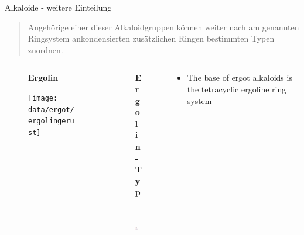   \begin{frame}[t]{Alkaloide - weitere Einteilung}
    \begin{quote}
      Angehörige einer dieser Alkaloidgruppen können weiter nach am genannten
      Ringsystem ankondensierten zusätzlichen Ringen bestimmten Typen zuordnen. \footnotemark  
    \end{quote}
  
  \begin{columns}[onlytextwidth,t]
    \begin{column}{0.3\textwidth}
      \begin{minipage}[c][0.9\textheight][l]{\linewidth}
       \begin{figure}
    \centering
    \textbf{Ergolin}\par\medskip
        \texttt{[image: data/ergot/ergolingerust]}%
\end{figure} 
      \end{minipage}
    \end{column}
    \begin{column}{0.3\textwidth}
   \begin{minipage}[c][0.9\textheight][l]{\linewidth}
       \begin{figure}
    \centering
    \textbf{Ergolin-Typ}\par\medskip
        \includegraphics[height=2cm]{data/ergot/ergolinabcd}%
\end{figure} 
      \end{minipage}
    \end{column}
   \begin{column}{0.3\textwidth}
      \begin{minipage}[c][0.9\textheight][l]{\linewidth}
     \begin{itemize}
       \item The base of ergot alkaloids is the tetracyclic ergoline ring
         system  
     \end{itemize}
      \end{minipage}
    \end{column}
  \end{columns}

\end{frame}

